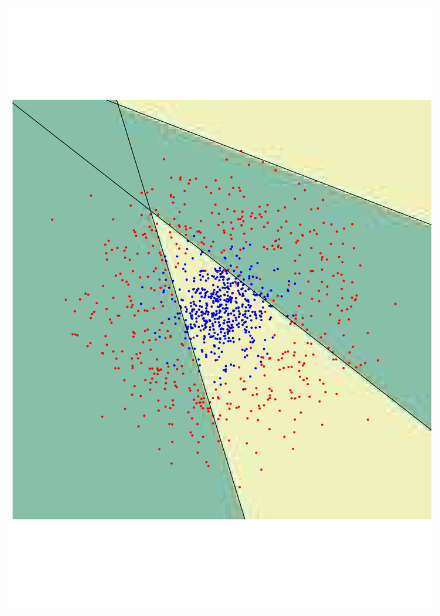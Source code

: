 \begin{figure}
\begin{center}
 \includegraphics[angle=270, scale=0.166]{ch4/figures/81.pdf}

\end{center}
\end{figure}
